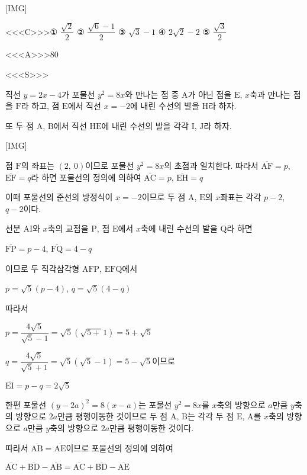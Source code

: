 \documentclass{oblivoir}
\begin{document}
[IMG]

<<<C>>>① $\dfrac{\sqrt{2}}{2}$ ② $\dfrac{\sqrt{6}-1}{2}$ ③ $\sqrt{3}-1$ ④ $2\sqrt{2}-2$ ⑤ $\dfrac{\sqrt{3}}{2}$

<<<A>>>$80$

<<<S>>>

직선 $y = 2x - 4$가 포물선 $y^{2}= 8x$와 만나는 점 중 $\mathrm{A}$가 아닌 점을 $\mathrm{E}$, $x$축과 만나는 점을 $\mathrm{F}$라 하고, 점 $\mathrm{E}$에서 직선 $x = -2$에 내린 수선의 발을 $\mathrm{H}$라 하자.

또 두 점 $\mathrm{A}$, $\mathrm{B}$에서 직선 $\mathrm{HE}$에 내린 수선의 발을 각각 $\mathrm{I}$, $\mathrm{J}$라 하자.

[IMG]

점 $\mathrm{F}$의 좌표는 $(2,\:0)$이므로 포물선 $y^{2}= 8x$의 초점과 일치한다. 따라서 $\overline{\mathrm{AF}} = p$, $\overline{\mathrm{EF}} = q$라 하면 포물선의 정의에 의하여 $\overline{\mathrm{AC}} = p$, $\overline{\mathrm{EH}} = q$

이때 포물선의 준선의 방정식이 $x = -2$이므로 두 점 $\mathrm{A}$, $\mathrm{E}$의 $x$좌표는 각각 $p-2$, $q-2$이다. 

선분 $\mathrm{AI}$와 $x$축의 교점을 $\mathrm{P}$, 점 $\mathrm{E}$에서 $x$축에 내린 수선의 발을 $\mathrm{Q}$라 하면 

$\overline{\mathrm{FP}} = p-4$, $\overline{\mathrm{FQ}} = 4- q$

이므로 두 직각삼각형 $\mathrm{AFP}$, $\mathrm{EFQ}$에서 

$p=\sqrt{5}(p-4)$, $q=\sqrt{5}(4-q)$

따라서

$p=\dfrac{4\sqrt{5}}{\sqrt{5}-1}=\sqrt{5}(\sqrt{5+}1)=5+\sqrt{5}$

$q=\dfrac{4\sqrt{5}}{\sqrt{5}+1}=\sqrt{5}(\sqrt{5}-1)=5-\sqrt{5}$이므로

$\overline{\mathrm{EI}} = p- q = 2\sqrt{5}$

한편 포물선 $(y-2a)^{2}= 8(x- a)$는 포물선 $y^{2}= 8x$를 $x$축의 방향으로 $a$만큼 $y$축의 방향으로 $2a$만큼 평행이동한 것이므로 두 점 $\mathrm{A}$, $\mathrm{B}$는 각각 두 점 $\mathrm{E}$, $\mathrm{A}$를 $x$축의 방향으로 $a$만큼 $y$축의 방향으로 $2a$만큼 평행이동한 것이다. 

따라서 $\overline{\mathrm{AB}} =\overline{\mathrm{AE}}$이므로 포물선의 정의에 의하여 

$\overline{\mathrm{AC}}+\overline{\mathrm{BD}}-\overline{\mathrm{AB}}$$=\overline{\mathrm{AC}} +\overline{\mathrm{BD}} -\overline{\mathrm{AE}}$
\end{document}
